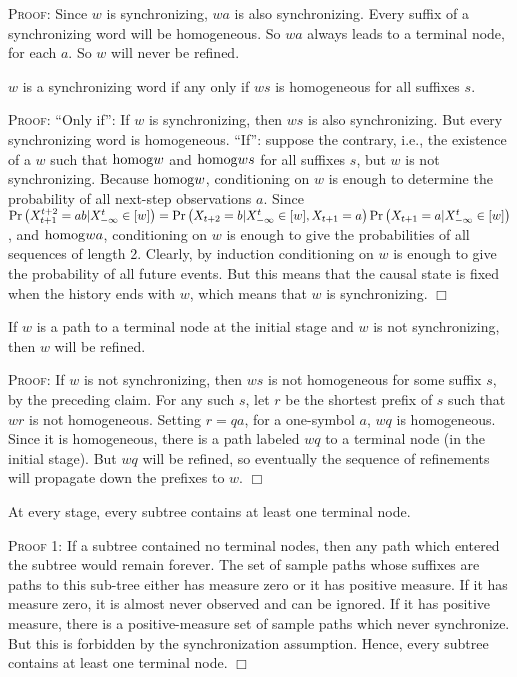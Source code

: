 \documentclass[../new-procedure.tex]{subfiles}
\begin{document}
\textsc{Proof:} Since $w$ is synchronizing, $wa$ is also synchronizing.  Every
suffix of a synchronizing word will be homogeneous.  So $wa$ always leads to a
terminal node, for each $a$.  So $w$ will never be refined.

\begin{proposition}
$w$ is a synchronizing word if any only if $ws$ is homogeneous
for all suffixes $s$.
\end{proposition}

\textsc{Proof:} ``Only if'': If $w$ is synchronizing, then $ws$ is also
synchronizing.  But every synchronizing word is homogeneous.  ``If'': suppose
the contrary, i.e., the existence of a $w$ such that $\mathrm{homog}{w}$ and
$\mathrm{homog}{ws}$ for all suffixes $s$, but $w$ is not synchronizing.  Because
$\mathrm{homog}{w}$, conditioning on $w$ is enough to determine the probability of all
next-step observations $a$.  Since $\mathrm{Pr}\left( X^{t+2}_{t+1} = ab|X^t_{-\infty} \in
  [w] \right)  = \mathrm{Pr}\left( X_{t+2} = b|X^{t}_{-\infty} \in [w], X_{t+1} = a \right) 
\mathrm{Pr}\left( X_{t+1}=a|X^t_{-\infty} \in [w] \right) $, and $\mathrm{homog}{wa}$, conditioning on $w$
is enough to give the probabilities of all sequences of length 2.  Clearly, by
induction conditioning on $w$ is enough to give the probability of all future
events.  But this means that the causal state is fixed when the history ends
with $w$, which means that $w$ is synchronizing. $\Box$

\begin{proposition}
  If $w$ is a path to a terminal node at the initial stage and $w$ is not
  synchronizing, then $w$ will be refined.
\end{proposition}

\textsc{Proof:} If $w$ is not synchronizing, then $ws$ is not homogeneous for
some suffix $s$, by the preceding claim.  For any such $s$, let $r$ be the
shortest prefix of $s$ such that $wr$ is not homogeneous.  Setting $r = qa$,
for a one-symbol $a$, $wq$ is homogeneous.  Since it is homogeneous, there is a
path labeled $wq$ to a terminal node (in the initial stage).  But $wq$ will be
refined, so eventually the sequence of refinements will propagate down the
prefixes to $w$. $\Box$

\begin{proposition}
At every stage, every subtree contains at least one terminal node.
\label{proposition:always-at-least-one-terminal-per-sub-tree}
\end{proposition}

\textsc{Proof 1:} If a subtree contained no terminal nodes, then any path which
entered the subtree would remain forever.  The set of sample paths whose
suffixes are paths to this sub-tree either has measure zero or it has positive
measure.  If it has measure zero, it is almost never observed and can be
ignored.  If it has positive measure, there is a positive-measure set of sample
paths which never synchronize.  But this is forbidden by the synchronization
assumption.  Hence, every subtree contains at least one terminal node. $\Box$
\end{document}
